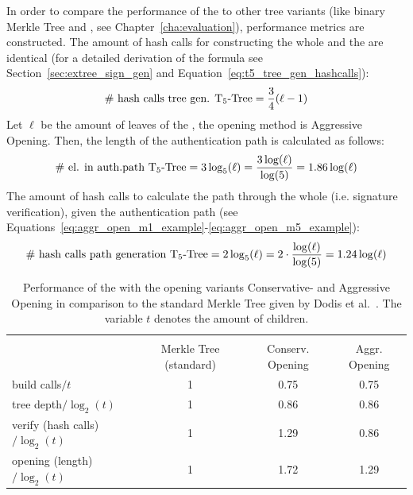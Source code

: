 In order to compare the performance of the \tftree to other tree variants (like binary Merkle Tree and \extree, see Chapter~\ref{cha:evaluation}), performance metrics are constructed. 
The amount of hash calls for constructing the whole \tftree and the \extree are identical (for a detailed derivation of the formula see Section~\ref{sec:extree_sign_gen} and Equation~\ref{eq:t5_tree_gen_hashcalls}):
\begin{equation}
\text{\# hash calls tree gen. T$_5$-Tree} = \frac{3}{4}(\ell-1)
\end{equation}
Let $\ell$ be the amount of leaves of the \tftree, the opening method is Aggressive Opening. Then, the length of the authentication path is calculated as follows:
\begin{equation}
\label{eq:t5_el_authpath}
\text{\# el. in auth.path T$_5$-Tree} = 3\log_5(\ell) = \frac{3\log(\ell)}{\log(5)} = 1.86\log(\ell)
\end{equation}
The amount of hash calls to calculate the path through the whole \tftree (i.e. signature verification), given the authentication path (see Equations~\ref{eq:aggr_open_m1_example}-\ref{eq:aggr_open_m5_example}):
\begin{equation}
\label{eq:t5_path_calc_hashcalls}
\text{\# hash calls path generation T$_5$-Tree} = 2\log_5(\ell) = 2 \cdot \frac{\log(\ell)}{\log(5)} = 1.24\log(\ell)
\end{equation}

\begin{table}
\centering
\begin{tabular}{l c c c} 
 \hline\noalign{\smallskip}
 \multicolumn{4}{c}{\textbf{\tftree Performance}} \\
 \noalign{\smallskip}
 & Merkle Tree (standard) & Conserv. Opening &  Aggr. Opening \\
 \hline\noalign{\smallskip}
 build calls$/t$ & 1 & 0.75 & 0.75 \\
 tree depth$/\log_2(t)$ & 1 & 0.86 & 0.86 \\
 verify (hash calls)$/\log_2(t)$ & 1 & 1.29 & 0.86 \\
 opening (length)$/\log_2(t)$ & 1 & 1.72 & 1.29 \\ 
 \hline
\end{tabular}
\caption{Performance of the \tftree with the opening variants Conservative- and Aggressive Opening in comparison to the standard Merkle Tree given by Dodis et al.~\cite{T5_paper}. The variable $t$ denotes the amount of children.}
\label{table:t5_merkletree_dodis_performance}
\end{table}

